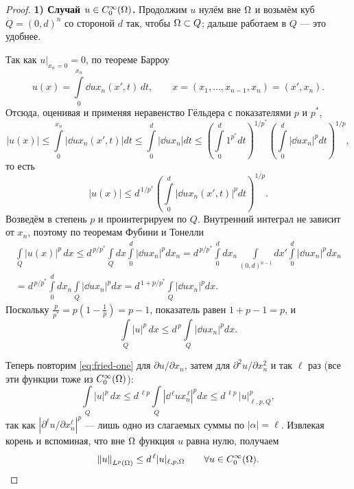 \begin{proof}
\textbf{1) Случай $u \in C_0^\infty(\Omega)$.} Продолжим $u$ нулём вне $\Omega$ и возьмём куб
$Q = (0,d)^n$ со стороной $d$ так, чтобы $\Omega \subset Q$; дальше работаем в $Q$ — это
удобнее.


Так как $u|_{x_n = 0} = 0$, по теореме Барроу
\[
  u(x) = \int\limits_0^{x_n} \dd{u}{x_n}(x', t)\, dt ,
  \qquad x = (x_1, \dots, x_{n-1}, x_n) = (x', x_n) .
\]
Отсюда, оценивая и применяя неравенство Гёльдера с показателями $p$ и $p^*$,
\[
  |u(x)| \le \int\limits_0^{x_n} \left| \dd{u}{x_n}(x',t) \right| dt
  \le \int\limits_0^{d} \left| \dd{u}{x_n} \right| dt
  \le \left( \int\limits_0^d 1^{p^*} dt \right)^{1/p^*}
      \left( \int\limits_0^d \left| \dd{u}{x_n} \right|^p dt \right)^{1/p} ,
\]
то есть
\[
  |u(x)| \le d^{\,1/p^*} \left( \int\limits_0^d \left| \dd{u}{x_n}(x',t) \right|^p dt \right)^{1/p} .
\]
Возведём в степень $p$ и проинтегрируем по $Q$. Внутренний интеграл не зависит от $x_n$,
поэтому по теоремам Фубини и Тонелли
\begin{multline*}
  \int\limits_Q |u(x)|^p\, dx
  \le d^{\,p/p^*} \int\limits_Q dx \int\limits_0^d \left| \dd{u}{x_n} \right|^p dx_n
  = d^{\,p/p^*} \int\limits_0^d dx_n \int\limits_{(0,d)^{n-1}} dx'
      \int\limits_0^d \left| \dd{u}{x_n} \right|^p dx_n \\
  = d^{\,p/p^*} \int\limits_0^d dx_n \int\limits_Q \left| \dd{u}{x_n} \right|^p dx
  = d^{\,1 + p/p^*} \int\limits_Q \left| \dd{u}{x_n} \right|^p dx .
\end{multline*}
Поскольку $\frac{p}{p^*} = p\left(1 - \frac1p\right) = p - 1$, показатель равен
$1 + p - 1 = p$, и
\begin{equation}\label{eq:fried-one}
  \int\limits_Q |u|^p\, dx \le d^{\,p} \int\limits_Q \left| \dd{u}{x_n} \right|^p dx .
\end{equation}

Теперь повторим \eqref{eq:fried-one} для $\partial u/\partial x_n$, затем для
$\partial^2 u/\partial x_n^2$ и так $\ell$ раз (все эти функции тоже из $C_0^\infty(\Omega)$):
\[
  \int\limits_Q |u|^p\, dx
  \le d^{\,\ell p} \int\limits_Q \left| \dd{^{\,\ell} u}{x_n^{\,\ell}} \right|^p dx
  \le d^{\,\ell p}\, |u|^p_{\ell,p,Q} ,
\]
так как $|\partial^\ell u/\partial x_n^\ell|^p$ — лишь одно из слагаемых суммы по
$|\alpha| = \ell$. Извлекая корень и вспоминая, что вне $\Omega$ функция $u$ равна нулю,
получаем
\[
  \left\lVert u \right\rVert_{L^{p}(\Omega)} \le d^{\,\ell} |u|_{\ell,p,\Omega}
  \qquad \forall u \in C_0^\infty(\Omega) .
\]


\end{proof}
